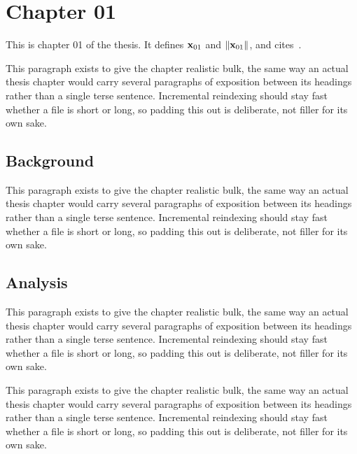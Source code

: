 \section{Chapter 01}
\label{sec:ch01}

This is chapter 01 of the thesis. It defines $\mathbf{x}_{01}$ and $\lVert \mathbf{x}_{01} \rVert$, and cites~\cite{ref1}.

This paragraph exists to give the chapter realistic bulk, the same way an actual thesis chapter would carry several paragraphs of exposition between its headings rather than a single terse sentence. Incremental reindexing should stay fast whether a file is short or long, so padding this out is deliberate, not filler for its own sake.

\subsection{Background}
\label{sec:ch01:background}

This paragraph exists to give the chapter realistic bulk, the same way an actual thesis chapter would carry several paragraphs of exposition between its headings rather than a single terse sentence. Incremental reindexing should stay fast whether a file is short or long, so padding this out is deliberate, not filler for its own sake.

\subsection{Analysis}
\label{sec:ch01:analysis}

This paragraph exists to give the chapter realistic bulk, the same way an actual thesis chapter would carry several paragraphs of exposition between its headings rather than a single terse sentence. Incremental reindexing should stay fast whether a file is short or long, so padding this out is deliberate, not filler for its own sake.

This paragraph exists to give the chapter realistic bulk, the same way an actual thesis chapter would carry several paragraphs of exposition between its headings rather than a single terse sentence. Incremental reindexing should stay fast whether a file is short or long, so padding this out is deliberate, not filler for its own sake.
